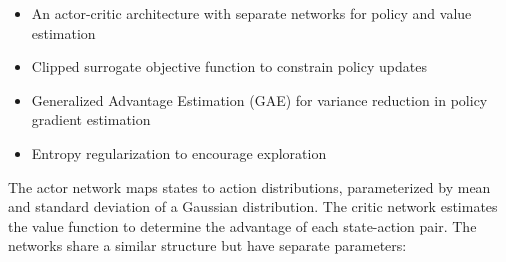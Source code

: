 \documentclass[12pt]{article}
\begin{document}

\begin{itemize}
    \item An actor-critic architecture with separate networks for policy and value estimation
    \item Clipped surrogate objective function to constrain policy updates
    \item Generalized Advantage Estimation (GAE) for variance reduction in policy gradient estimation
    \item Entropy regularization to encourage exploration
\end{itemize}


The actor network maps states to action distributions, parameterized by mean and standard deviation of a Gaussian distribution. The critic network estimates the value function to determine the advantage of each state-action pair. The networks share a similar structure but have separate parameters:

\end{document}
